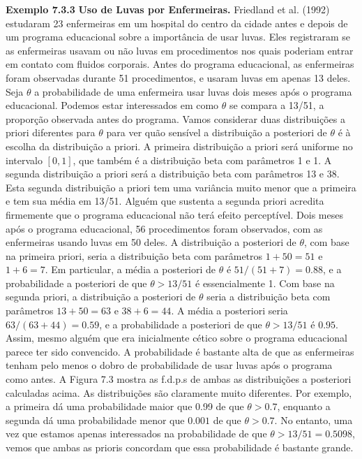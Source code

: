 \vspace{1cm}
\noindent\textbf{Exemplo 7.3.3} \quad \textbf{Uso de Luvas por Enfermeiras.} Friedland et al. (1992) estudaram 23 enfermeiras em um hospital do centro da cidade antes e depois de um programa educacional sobre a importância de usar luvas. Eles registraram se as enfermeiras usavam ou não luvas em procedimentos nos quais poderiam entrar em contato com fluidos corporais. Antes do programa educacional, as enfermeiras foram observadas durante 51 procedimentos, e usaram luvas em apenas 13 deles. Seja $\theta$ a probabilidade de uma enfermeira usar luvas dois meses após o programa educacional. Podemos estar interessados em como $\theta$ se compara a 13/51, a proporção observada antes do programa.
Vamos considerar duas distribuições a priori diferentes para $\theta$ para ver quão sensível a distribuição a posteriori de $\theta$ é à escolha da distribuição a priori. A primeira distribuição a priori será uniforme no intervalo $[0, 1]$, que também é a distribuição beta com parâmetros 1 e 1. A segunda distribuição a priori será a distribuição beta com parâmetros 13 e 38. Esta segunda distribuição a priori tem uma variância muito menor que a primeira e tem sua média em 13/51. Alguém que sustenta a segunda priori acredita firmemente que o programa educacional não terá efeito perceptível.
Dois meses após o programa educacional, 56 procedimentos foram observados, com as enfermeiras usando luvas em 50 deles. A distribuição a posteriori de $\theta$, com base na primeira priori, seria a distribuição beta com parâmetros $1+50=51$ e $1+6=7$. Em particular, a média a posteriori de $\theta$ é $51/(51+7)=0.88$, e a probabilidade a posteriori de que $\theta > 13/51$ é essencialmente 1. Com base na segunda priori, a distribuição a posteriori de $\theta$ seria a distribuição beta com parâmetros $13+50=63$ e $38+6=44$. A média a posteriori seria $63/(63+44)=0.59$, e a probabilidade a posteriori de que $\theta > 13/51$ é $0.95$. Assim, mesmo alguém que era inicialmente cético sobre o programa educacional parece ter sido convencido. A probabilidade é bastante alta de que as enfermeiras tenham pelo menos o dobro de probabilidade de usar luvas após o programa como antes.
A Figura 7.3 mostra as f.d.p.s de ambas as distribuições a posteriori calculadas acima. As distribuições são claramente muito diferentes. Por exemplo, a primeira dá uma probabilidade maior que 0.99 de que $\theta>0.7$, enquanto a segunda dá uma probabilidade menor que $0.001$ de que $\theta>0.7$. No entanto, uma vez que estamos apenas interessados na probabilidade de que $\theta > 13/51=0.5098$, vemos que ambas as prioris concordam que essa probabilidade é bastante grande.

